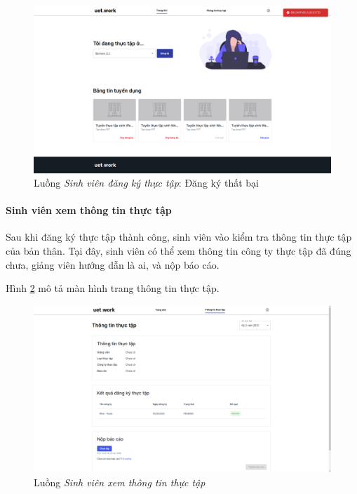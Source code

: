 \documentclass[./../main.tex]{subfiles}
\begin{document}
\begin{figure}[]
	\includegraphics[width=\linewidth]{./images/image40.png}
	\caption{Luồng \emph{Sinh viên đăng ký thực tập}: Đăng ký thất bại}
	\label{fig:student_register_company_failed}
\end{figure}

\paragraph*{Sinh viên xem thông tin thực tập}
Sau khi đăng ký thực tập thành công, sinh viên vào kiểm tra thông tin thực tập của bản thân. Tại đây, sinh viên có thể xem thông tin công ty thực tập đã đúng chưa,  giảng viên hướng dẫn là ai, và nộp báo cáo.

Hình \ref{fig:view_internship_page} mô tả màn hình trang thông tin thực tập.

\begin{figure}[]
	\includegraphics[width=\linewidth]{./images/image17.png}
	\caption{Luồng \emph{Sinh viên xem thông tin thực tập}}
	\label{fig:view_internship_page}
\end{figure}
\end{document}
